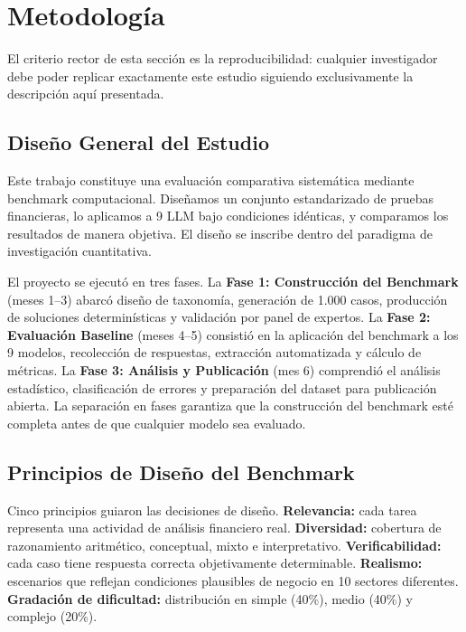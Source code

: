 \documentclass[12pt,a4paper]{article}
\begin{document}
\section{Metodología}\label{sec:metodologia}

El criterio rector de esta sección es la reproducibilidad: cualquier investigador debe poder replicar exactamente este estudio siguiendo exclusivamente la descripción aquí presentada.

\subsection{Diseño General del Estudio}

Este trabajo constituye una evaluación comparativa sistemática mediante benchmark computacional. Diseñamos un conjunto estandarizado de pruebas financieras, lo aplicamos a 9 LLM bajo condiciones idénticas, y comparamos los resultados de manera objetiva. El diseño se inscribe dentro del paradigma de investigación cuantitativa.

El proyecto se ejecutó en tres fases. La \textbf{Fase 1: Construcción del Benchmark} (meses 1--3) abarcó diseño de taxonomía, generación de 1.000 casos, producción de soluciones determinísticas y validación por panel de expertos. La \textbf{Fase 2: Evaluación Baseline} (meses 4--5) consistió en la aplicación del benchmark a los 9 modelos, recolección de respuestas, extracción automatizada y cálculo de métricas. La \textbf{Fase 3: Análisis y Publicación} (mes 6) comprendió el análisis estadístico, clasificación de errores y preparación del dataset para publicación abierta. La separación en fases garantiza que la construcción del benchmark esté completa antes de que cualquier modelo sea evaluado.

\subsection{Principios de Diseño del Benchmark}

Cinco principios guiaron las decisiones de diseño. \textbf{Relevancia:} cada tarea representa una actividad de análisis financiero real. \textbf{Diversidad:} cobertura de razonamiento aritmético, conceptual, mixto e interpretativo. \textbf{Verificabilidad:} cada caso tiene respuesta correcta objetivamente determinable. \textbf{Realismo:} escenarios que reflejan condiciones plausibles de negocio en 10 sectores diferentes. \textbf{Gradación de dificultad:} distribución en simple (40\%), medio (40\%) y complejo (20\%).
\end{document}
